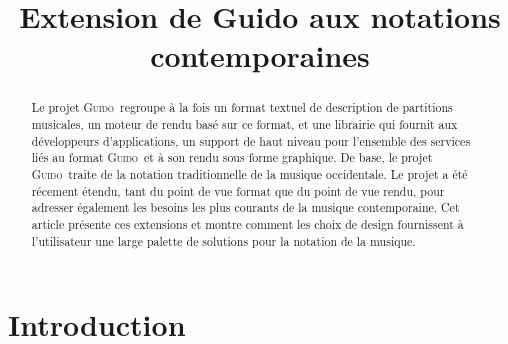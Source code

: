 \documentclass{article}
\title{\centering Extension de Guido aux notations contemporaines}
\newcommand{\guido}			{\textsc{Guido}}
\begin{document}

\maketitle

\begin{abstract}

Le projet \guido\ regroupe à la fois un format textuel de description de partitions musicales, un moteur de rendu basé sur ce format, et une librairie qui fournit aux développeurs d'applications, un support de haut niveau pour l'ensemble des services liés au format \guido\ et à son rendu sous forme graphique. 
De base, le projet \guido\ traite de la notation traditionnelle de la musique occidentale. Le projet a été récement étendu, tant du point de vue format que du point de vue rendu, pour adresser également les besoins les plus courants de la musique contemporaine. Cet article présente ces extensions et montre comment les choix de design fournissent à l'utilisateur une large palette de solutions pour la notation de la musique. 


\end{abstract}


\section{Introduction}\label{sec:introduction}

% 
\end{document}
